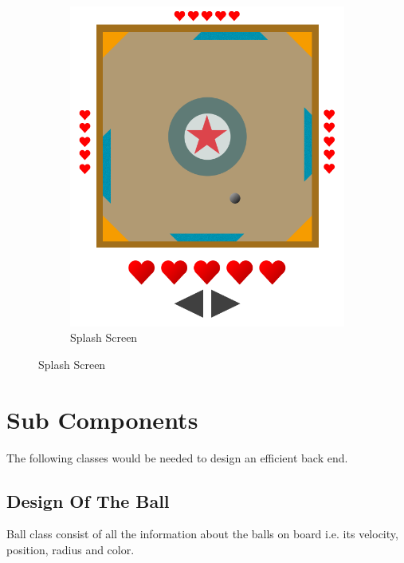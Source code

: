 \documentclass{article}
\begin{document}
	    \begin{figure}[H]
      \centering
      \begin{subfigure}{.4\textwidth}
          \centering
          \includegraphics[width=0.9\linewidth]{UI.png}
          \caption{Splash Screen}
          \label{fig:sub1}
      \end{subfigure}
    \end{figure}


	\section{Sub Components}
	The following classes would be needed to design an efficient back end.
\subsection{Design Of The Ball} Ball class consist of all the information about the balls on board i.e. its velocity, position, radius and color.
\end{document}
